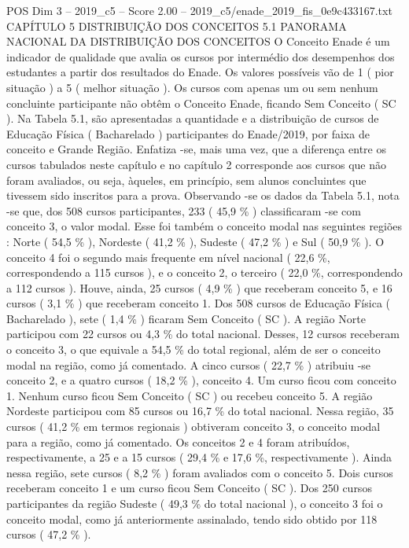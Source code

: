 \begin{textsample}{POS Dim 3 – 2019\_c5 – Score 2.00 – 2019\_c5/enade\_2019\_fis\_0e9c433167.txt}  \label{ex:f3_pos_071}
CAPÍTULO 5 DISTRIBUIÇÃO DOS CONCEITOS 5.1 PANORAMA NACIONAL DA DISTRIBUIÇÃO DOS CONCEITOS O Conceito Enade é um indicador de qualidade que avalia os cursos por intermédio dos desempenhos dos estudantes a partir dos resultados do Enade.
Os valores possíveis vão de 1 ( pior situação ) a 5 ( melhor situação ).
Os cursos com apenas um ou sem nenhum concluinte participante não obtêm o Conceito Enade, ficando Sem Conceito ( SC ).
Na Tabela 5.1, são apresentadas a quantidade e a distribuição de cursos de Educação Física ( Bacharelado ) participantes do Enade/2019, por faixa de conceito e Grande Região.
Enfatiza -se, mais uma vez, que a diferença entre os cursos tabulados neste capítulo e no capítulo 2 corresponde aos cursos que não foram avaliados, ou seja, àqueles, em princípio, sem alunos concluintes que tivessem sido inscritos para a prova.
Observando -se os dados da Tabela 5.1, nota -se que, dos 508 cursos participantes, 233 ( 45,9 \% ) classificaram -se com conceito 3, o valor modal.
Esse foi também o conceito modal nas seguintes regiões : Norte ( 54,5 \% ), Nordeste ( 41,2 \% ), Sudeste ( 47,2 \% ) e Sul ( 50,9 \% ).
O conceito 4 foi o segundo mais frequente em nível nacional ( 22,6 \%, correspondendo a 115 cursos ), e o conceito 2, o terceiro ( 22,0 \%, correspondendo a 112 cursos ).
Houve, ainda, 25 cursos ( 4,9 \% ) que receberam conceito 5, e 16 cursos ( 3,1 \% ) que receberam conceito 1.
Dos 508 cursos de Educação Física ( Bacharelado ), sete ( 1,4 \% ) ficaram Sem Conceito ( SC ).
A região Norte participou com 22 cursos ou 4,3 \% do total nacional.
Desses, 12 cursos receberam o conceito 3, o que equivale a 54,5 \% do total regional, além de ser o conceito modal na região, como já comentado.
A cinco cursos ( 22,7 \% ) atribuiu -se conceito 2, e a quatro cursos ( 18,2 \% ), conceito 4.
Um curso ficou com conceito 1.
Nenhum curso ficou Sem Conceito ( SC ) ou recebeu conceito 5.
A região Nordeste participou com 85 cursos ou 16,7 \% do total nacional.
Nessa região, 35 cursos ( 41,2 \% em termos regionais ) obtiveram conceito 3, o conceito modal para a região, como já comentado.
Os conceitos 2 e 4 foram atribuídos, respectivamente, a 25 e a 15 cursos ( 29,4 \% e 17,6 \%, respectivamente ).
Ainda nessa região, sete cursos ( 8,2 \% ) foram avaliados com o conceito 5.
Dois cursos receberam conceito 1 e um curso ficou Sem Conceito ( SC ).
Dos 250 cursos participantes da região Sudeste ( 49,3 \% do total nacional ), o conceito 3 foi o conceito modal, como já anteriormente assinalado, tendo sido obtido por 118 cursos ( 47,2 \% ).

\end{textsample}
